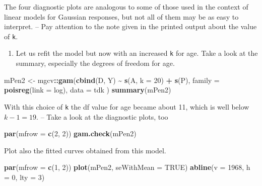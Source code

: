 \documentclass[
]{book}
\newenvironment{Shaded}{\begin{snugshade}}{\end{snugshade}}
\newcommand{\AttributeTok}[1]{\textcolor[rgb]{0.13,0.29,0.53}{#1}}
\newcommand{\ConstantTok}[1]{\textcolor[rgb]{0.56,0.35,0.01}{#1}}
\newcommand{\DecValTok}[1]{\textcolor[rgb]{0.00,0.00,0.81}{#1}}
\newcommand{\FunctionTok}[1]{\textcolor[rgb]{0.13,0.29,0.53}{\textbf{#1}}}
\newcommand{\NormalTok}[1]{#1}
\newcommand{\OtherTok}[1]{\textcolor[rgb]{0.56,0.35,0.01}{#1}}
\newcommand{\SpecialCharTok}[1]{\textcolor[rgb]{0.81,0.36,0.00}{\textbf{#1}}}
\providecommand{\tightlist}{%
  \setlength{\itemsep}{0pt}\setlength{\parskip}{0pt}}
\begin{document}
The four diagnostic plots are analogous to some of those used in the
context of linear models for Gaussian responses, but not all of them may
be as easy to interpret. -- Pay attention to the note given in the
printed output about the value of \texttt{k}.

\begin{enumerate}
\def\labelenumi{\arabic{enumi}.}
\setcounter{enumi}{3}
\tightlist
\item
  Let us refit the model but now with an increased \texttt{k} for age.
  Take a look at the summary, especially the degrees of freedom for age.
\end{enumerate}

\begin{Shaded}
\begin{Highlighting}[]
\NormalTok{mPen2 }\OtherTok{\textless{}{-}}\NormalTok{ mgcv}\SpecialCharTok{::}\FunctionTok{gam}\NormalTok{(}\FunctionTok{cbind}\NormalTok{(D, Y) }\SpecialCharTok{\textasciitilde{}} \FunctionTok{s}\NormalTok{(A, }\AttributeTok{k =} \DecValTok{20}\NormalTok{) }\SpecialCharTok{+} \FunctionTok{s}\NormalTok{(P),}
  \AttributeTok{family =} \FunctionTok{poisreg}\NormalTok{(}\AttributeTok{link =}\NormalTok{ log), }\AttributeTok{data =}\NormalTok{ tdk}
\NormalTok{)}
\FunctionTok{summary}\NormalTok{(mPen2)}
\end{Highlighting}
\end{Shaded}

With this choice of \texttt{k} the df value for age became about 11, which is
well below \(k-1 = 19\). -- Take a look at the diagnostic plots, too

\begin{Shaded}
\begin{Highlighting}[]
\FunctionTok{par}\NormalTok{(}\AttributeTok{mfrow =} \FunctionTok{c}\NormalTok{(}\DecValTok{2}\NormalTok{, }\DecValTok{2}\NormalTok{))}
\FunctionTok{gam.check}\NormalTok{(mPen2)}
\end{Highlighting}
\end{Shaded}

Plot also the fitted curves obtained from this model.

\begin{Shaded}
\begin{Highlighting}[]
\FunctionTok{par}\NormalTok{(}\AttributeTok{mfrow =} \FunctionTok{c}\NormalTok{(}\DecValTok{1}\NormalTok{, }\DecValTok{2}\NormalTok{))}
\FunctionTok{plot}\NormalTok{(mPen2, }\AttributeTok{seWithMean =} \ConstantTok{TRUE}\NormalTok{)}
\FunctionTok{abline}\NormalTok{(}\AttributeTok{v =} \DecValTok{1968}\NormalTok{, }\AttributeTok{h =} \DecValTok{0}\NormalTok{, }\AttributeTok{lty =} \DecValTok{3}\NormalTok{)}
\end{Highlighting}
\end{Shaded}
\end{document}
